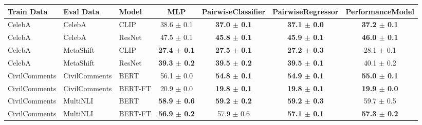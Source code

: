 \scriptsize
\begin{tabular}{lllcccc}
\toprule
Train Data & Eval Data & Model & MLP & PairwiseClassifier & PairwiseRegressor & PerformanceModel \\
\midrule
CelebA & CelebA & CLIP & 38.6 $\pm$ 0.1 & \textbf{37.0 $\pm$ 0.1} & \textbf{37.1 $\pm$ 0.0} & \textbf{37.2 $\pm$ 0.1} \\
CelebA & CelebA & ResNet & 47.5 $\pm$ 0.1 & \textbf{45.8 $\pm$ 0.1} & \textbf{45.9 $\pm$ 0.1} & \textbf{46.0 $\pm$ 0.1} \\
CelebA & MetaShift & CLIP & \textbf{27.4 $\pm$ 0.1} & \textbf{27.5 $\pm$ 0.1} & \textbf{27.2 $\pm$ 0.3} & 28.1 $\pm$ 0.1 \\
CelebA & MetaShift & ResNet & \textbf{39.3 $\pm$ 0.2} & \textbf{39.5 $\pm$ 0.2} & \textbf{39.5 $\pm$ 0.1} & 40.1 $\pm$ 0.2 \\
CivilComments & CivilComments & BERT & 56.1 $\pm$ 0.0 & \textbf{54.8 $\pm$ 0.1} & \textbf{54.9 $\pm$ 0.1} & \textbf{55.0 $\pm$ 0.1} \\
CivilComments & CivilComments & BERT-FT & 20.9 $\pm$ 0.0 & \textbf{19.8 $\pm$ 0.1} & \textbf{19.8 $\pm$ 0.1} & \textbf{19.9 $\pm$ 0.0} \\
CivilComments & MultiNLI & BERT & \textbf{58.9 $\pm$ 0.6} & \textbf{59.2 $\pm$ 0.2} & \textbf{59.2 $\pm$ 0.3} & 59.7 $\pm$ 0.5 \\
CivilComments & MultiNLI & BERT-FT & \textbf{56.9 $\pm$ 0.2} & 57.9 $\pm$ 0.6 & \textbf{57.1 $\pm$ 0.1} & \textbf{57.3 $\pm$ 0.2} \\
\bottomrule
\end{tabular}
